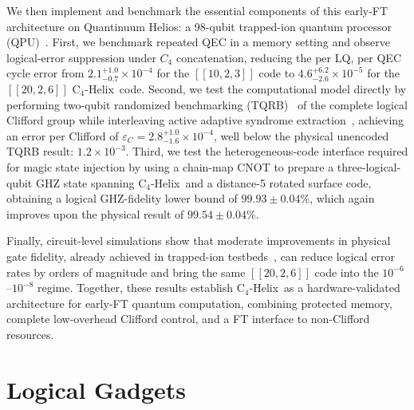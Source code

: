\documentclass[aps,prx,reprint,showpacs,twocolumn,superscriptaddress,eqsecnum]{revtex4-2}
\newcommand{\chelix}{C$_4$-Helix}
\begin{document}
We then implement and benchmark the essential components of this early-FT architecture on Quantinuum Helios: a 98-qubit trapped-ion quantum processor (QPU)~\cite{Ransford2026}. 
First, we benchmark repeated QEC in a memory setting and observe logical-error suppression under $C_4$ concatenation, reducing the per LQ, per QEC cycle error from $2.1^{+1.0}_{-0.7}\times10^{-4}$ for the $[[10,2,3]]$ code to $4.6^{+6.2}_{-2.6}\times10^{-5}$ for the $[[20,2,6]]$ \chelix\ code.
Second, we test the computational model directly by performing two-qubit randomized benchmarking (TQRB)~\cite{magesan2011, combes2017} of the complete logical Clifford group while interleaving active adaptive syndrome extraction~\cite{Berthusen_2025}, achieving an error per Clifford of $\varepsilon_C = 2.8^{+1.0}_{-1.6}\times 10^{-4}$, well below the physical unencoded TQRB result: $1.2\times 10^{-3}$.
Third, we test the heterogeneous-code interface required for magic state injection by using a chain-map CNOT to prepare a three-logical-qubit GHZ state spanning \chelix\ and a distance-5 rotated surface code, obtaining a logical GHZ-fidelity lower bound of $99.93\pm0.04\%$, which again improves upon the physical result of $99.54 \pm 0.04\%$.

Finally, circuit-level simulations show that moderate improvements in physical gate fidelity, already achieved in trapped-ion testbeds~\cite{hughes2025}, can reduce logical error rates by orders of magnitude and bring the same $[[20,2,6]]$ code into the $10^{-6}$--$10^{-8}$ regime.
Together, these results establish \chelix\ as a hardware-validated architecture for early-FT quantum computation, combining protected memory, complete low-overhead Clifford control, and a FT interface to non-Clifford resources.


\section{Logical Gadgets}
\end{document}
